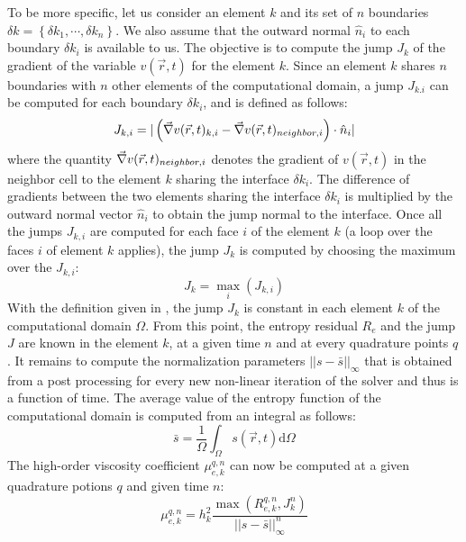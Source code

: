 To be more specific, let us consider an element $k$ and its set of $n$ boundaries $\delta k = \left\{ \delta k_1, \cdots, \delta k_n \right\}$. We also assume that the outward normal $\hat{n}_i$ to each boundary $\delta k_i$ is available to us. The objective is to compute the jump $J_k$ of the gradient of the variable $v(\vec{r},t)$ for the element $k$. Since an element $k$ shares $n$ boundaries with $n$ other elements of the computational domain, a jump $J_{k.i}$ can be computed for each boundary $\delta k_i$, and is defined as follows:
%
\begin{equation}\label{eq:jump_def_sct2}
J_{k,i} = | \left( \vec{\nabla} v(\vec{r},t)_{k,i} - \vec{\nabla} v(\vec{r},t)_{neighbor,i} \right) \cdot \hat{n}_i |
\end{equation}
% 
where the quantity $\vec{\nabla} v(\vec{r},t)_{neighbor,i}$ denotes the gradient of $v(\vec{r},t)$ in the neighbor cell to the element $k$ sharing the interface $\delta k_i$. The difference of gradients between the two elements sharing the interface $\delta k_i$ is multiplied by the outward normal vector $\hat{n}_i$ to obtain the jump normal to the interface. Once all the jumps $J_{k,i}$ are computed for each face $i$ of the element $k$ (a loop over the faces $i$ of element $k$ applies), the jump $J_k$ is computed by choosing the maximum over the $J_{k,i}$:
%
\begin{equation}\label{eq:jump_def2_sct2}
J_k = \max_i \left( J_{k,i} \right)
\end{equation}
%
With the definition given in , the jump $J_k$ is constant in each element $k$ of the computational domain $\Omega$. From this point, the entropy residual $R_e$ and the jump $J$ are known in the element $k$, at a given time $n$ and at every quadrature points $q$. It remains to compute the normalization parameters $|| s - \bar{s} ||_\infty$ that is obtained from a post processing for every new non-linear iteration of the solver and thus is a function of time. The average value of the entropy function of the computational domain is computed from an integral as follows:
%
\begin{equation}\label{eq:sbar_sct2}
\bar{s} = \frac{1}{\Omega} \int_{\Omega} s(\vec{r},t) \text{d}\Omega
\end{equation}
%   
The high-order viscosity coefficient $\mu_{e,k}^{q,n}$ can now be computed at a given quadrature potions $q$ and given time $n$:
%
\begin{equation}\label{eq:visc_ev2_sct2}
\mu_{e,k}^{q,n} = h_k^2 \frac{\max \left( R_{e,k}^{q,n}, J_k^n \right)}{|| s - \bar{s} ||_\infty^n}
\end{equation}
